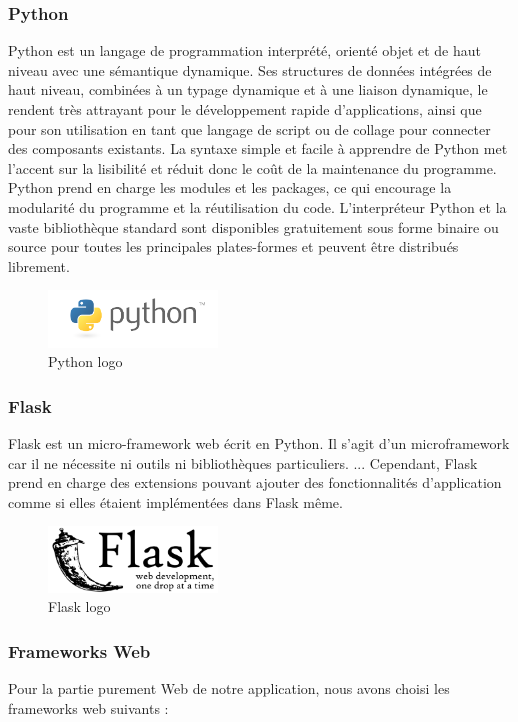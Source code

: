 \subsubsection*{Python}
Python est un langage de programmation interprété, orienté objet et de haut niveau avec une sémantique dynamique. Ses structures de données intégrées de haut niveau, combinées à un typage dynamique et à une liaison dynamique, le rendent très attrayant pour le développement rapide d'applications, ainsi que pour son utilisation en tant que langage de script ou de collage pour connecter des composants existants. La syntaxe simple et facile à apprendre de Python met l'accent sur la lisibilité et réduit donc le coût de la maintenance du programme. Python prend en charge les modules et les packages, ce qui encourage la modularité du programme et la réutilisation du code. L'interpréteur Python et la vaste bibliothèque standard sont disponibles gratuitement sous forme binaire ou source pour toutes les principales plates-formes et peuvent être distribués librement.
\begin{figure}[!ht]\centering
\includegraphics[width=0.4\textwidth]{chapitres/chapitrex/figures/python.png}
\caption{Python logo }
\label{fig:python}
\end{figure}
\subsubsection*{Flask}
Flask est un micro-framework web écrit en Python. Il s’agit d’un microframework car il ne nécessite ni outils ni bibliothèques particuliers. ... Cependant, Flask prend en charge des extensions pouvant ajouter des fonctionnalités d'application comme si elles étaient implémentées dans Flask même.
\begin{figure}[!ht]\centering
\includegraphics[width=0.4\textwidth]{chapitres/chapitrex/figures/flask.png}
\caption{Flask logo }
\label{fig:flask}
\end{figure}
\subsubsection*{Frameworks Web}
Pour la partie purement Web de notre application, nous avons choisi les frameworks web suivants :
